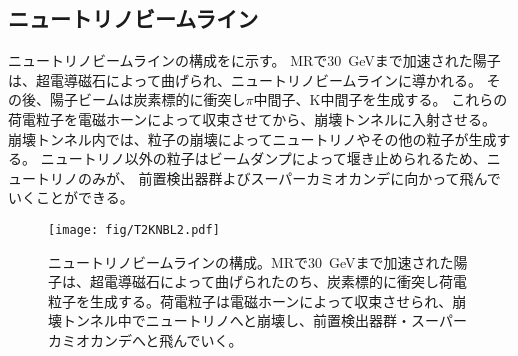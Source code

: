 \newpage
\subsection{ニュートリノビームライン}
ニュートリノビームラインの構成をに示す。
MRで\qty{30}{\GeV}まで加速された陽子は、超電導磁石によって曲げられ、ニュートリノビームラインに導かれる。
その後、陽子ビームは炭素標的に衝突し$\pi$中間子、K中間子を生成する。
これらの荷電粒子を電磁ホーンによって収束させてから、崩壊トンネルに入射させる。
崩壊トンネル内では、粒子の崩壊によってニュートリノやその他の粒子が生成する。
ニュートリノ以外の粒子はビームダンプによって堰き止められるため、ニュートリノのみが、
前置検出器群よびスーパーカミオカンデに向かって飛んでいくことができる。

\begin{figure}[htbp]
\centering
\texttt{[image: fig/T2KNBL2.pdf]}
\caption[ニュートリノビームラインの構成]{ニュートリノビームラインの構成。MRで\qty{30}{\GeV}まで加速された陽子は、超電導磁石によって曲げられたのち、炭素標的に衝突し荷電粒子を生成する。荷電粒子は電磁ホーンによって収束させられ、崩壊トンネル中でニュートリノへと崩壊し、前置検出器群・スーパーカミオカンデへと飛んでいく。}
\label{T2KNeutrinoBeamline}
\end{figure}


%



